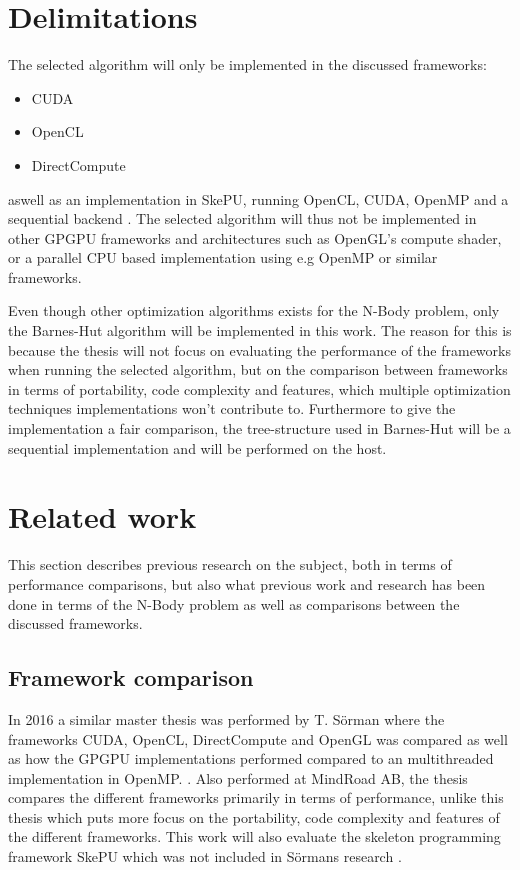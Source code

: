 \section{Delimitations}

The selected algorithm will only be implemented in the discussed frameworks:
\begin{itemize}
    \item CUDA
    \item OpenCL
    \item DirectCompute
\end{itemize}

\noindent aswell as an implementation in SkePU, running OpenCL, CUDA, OpenMP and a sequential backend \cite{enmyren2010skepu}. The selected algorithm will thus not be implemented in other GPGPU frameworks and architectures such as OpenGL's compute shader, or a parallel CPU based implementation using e.g OpenMP or similar frameworks.

Even though other optimization algorithms exists for the N-Body problem, only the Barnes-Hut algorithm will be implemented in this work. The reason for this is because the thesis will not focus on evaluating the performance of the frameworks when running the selected algorithm, but on the comparison between frameworks in terms of portability, code complexity and features, which multiple optimization techniques implementations won't contribute to. Furthermore to give the implementation a fair comparison, the tree-structure used in Barnes-Hut will be a sequential implementation and will be performed on the host.

\section{Related work}
This section describes previous research on the subject, both in terms of performance comparisons, but also what previous work and research has been done in terms of the N-Body problem as well as comparisons between the discussed frameworks.


\subsection{Framework comparison}
In 2016 a similar master thesis was performed by T. Sörman where the frameworks CUDA, OpenCL, DirectCompute and OpenGL was compared as well as how the GPGPU implementations performed compared to an multithreaded implementation in OpenMP. \cite{Torbjorn}. Also performed at MindRoad AB, the thesis compares the different frameworks primarily in terms of performance, unlike this thesis which puts more focus on the portability, code complexity and features of the different frameworks. This work will also evaluate the skeleton programming framework SkePU which was not included in Sörmans research \cite{enmyren2010skepu}. 


